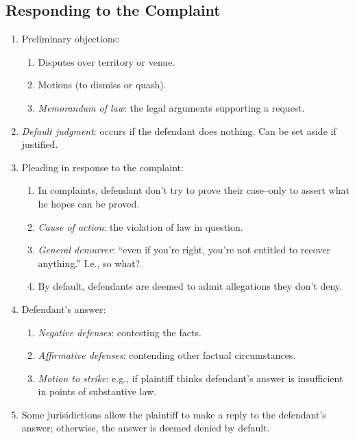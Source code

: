 \subsection{Responding to the Complaint}

\begin{enumerate}
    \item Preliminary objections:
    \begin{enumerate}
        \item Disputes over territory or venue.
        \item Motions (to dismiss or quash).
        \item \emph{Memorandum of law}: the legal arguments supporting a 
        request.
    \end{enumerate}
    \item \emph{Default judgment}: occurs if the defendant does nothing. Can 
    be set aside if justified.
    \item Pleading in response to the complaint:
    \begin{enumerate}
        \item In complaints, defendant don't try to prove their case--only to 
        assert what he hopes can be proved.
        \item \emph{Cause of action}: the violation of law in question.
        \item \emph{General demurrer}: ``even if you're right, you're not 
        entitled to recover anything.'' I.e., so what?
        \item By default, defendants are deemed to admit allegations they 
        don't deny.
    \end{enumerate}
    \item Defendant's answer:
    \begin{enumerate}
        \item \emph{Negative defenses}: contesting the facts.
        \item \emph{Affirmative defenses}: contending other factual 
        circumstances.
        \item \emph{Motion to strike}: e.g., if plaintiff thinks defendant's 
        answer is insufficient in points of substantive law.
    \end{enumerate}
    \item Some jurisidictions allow the plaintiff to make a reply to the 
    defendant's answer; otherwise, the answer is deemed denied by default.
\end{enumerate}

